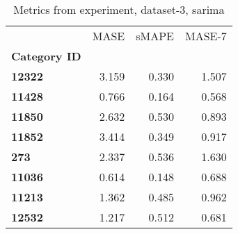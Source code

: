 \begin{table}[h]
\centering
\caption{Metrics from experiment, dataset-3, sarima}
\label{table:sarima-dataset-3}
\begin{tabular}{lrrr}
\toprule
{} &   MASE &  sMAPE &  MASE-7 \\
\textbf{Category ID} &        &        &         \\
\midrule
\textbf{12322      } &  3.159 &  0.330 &   1.507 \\
\textbf{11428      } &  0.766 &  0.164 &   0.568 \\
\textbf{11850      } &  2.632 &  0.530 &   0.893 \\
\textbf{11852      } &  3.414 &  0.349 &   0.917 \\
\textbf{273        } &  2.337 &  0.536 &   1.630 \\
\textbf{11036      } &  0.614 &  0.148 &   0.688 \\
\textbf{11213      } &  1.362 &  0.485 &   0.962 \\
\textbf{12532      } &  1.217 &  0.512 &   0.681 \\
\bottomrule
\end{tabular}
\end{table}
